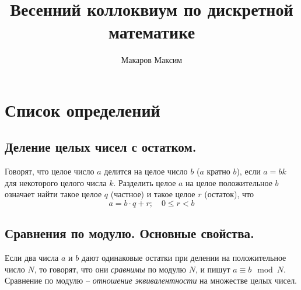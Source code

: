 \documentclass{article}
\author{Макаров Максим}
\title{Весенний коллоквиум по дискретной математике}
\date{}
\begin{document}
\begin{samepage}
\maketitle
\tableofcontents{}
\end{samepage}
\section{Список определений}
\begin{samepage}
\subsection{Деление целых чисел с остатком.}
Говорят, что целое число $a$ делится на целое число $b$ ($a$ кратно $b$), если $a = bk$ для некоторого целого числа $k$. Разделить целое $a$ на целое положительное $b$ означает найти такое целое $q$ (частное) и такое целое $r$ (остаток), что
\[
a = b \cdot q + r;
\quad
0 \leqslant r < b
\]


\subsection{Сравнения по модулю. Основные свойства.}
Если два числа $a$ и $b$ дают одинаковые остатки при делении на положительное число $N$, то говорят, что они \textit{сравнимы} по модулю $N$, и пишут $a \equiv b \mod{N}$. Сравнение по модулю -- \textit{отношение эквивалентности} на множестве целых чисел.

\end{samepage}
\end{document}
